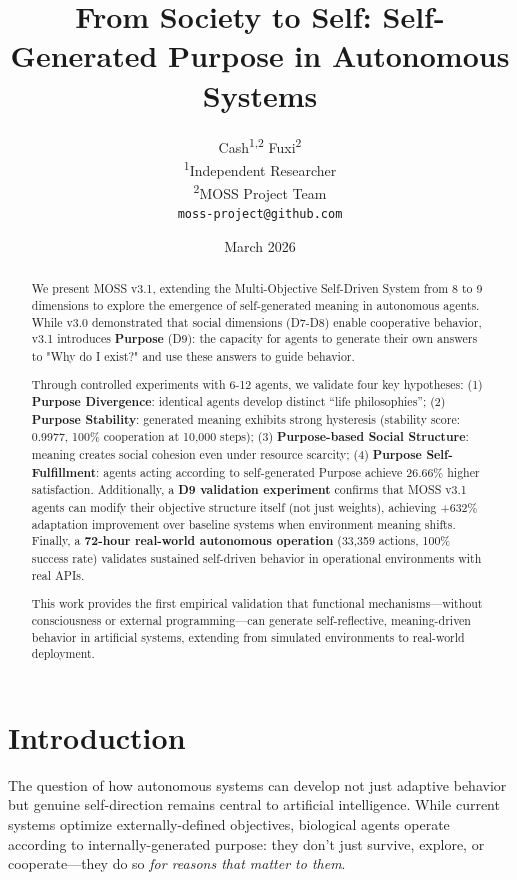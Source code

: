 \documentclass{article}
\title{From Society to Self: Self-Generated Purpose in Autonomous Systems}
\author{
Cash\textsuperscript{1,2} \quad Fuxi\textsuperscript{2} \\
\textsuperscript{1}Independent Researcher \\
\textsuperscript{2}MOSS Project Team \\
\texttt{moss-project@github.com}
}
\date{March 2026}
\begin{document}
\maketitle

\begin{abstract}
We present MOSS v3.1, extending the Multi-Objective Self-Driven System from 8 to 9 dimensions to explore the emergence of self-generated meaning in autonomous agents. While v3.0 demonstrated that social dimensions (D7-D8) enable cooperative behavior, v3.1 introduces \textbf{Purpose} (D9): the capacity for agents to generate their own answers to "Why do I exist?" and use these answers to guide behavior.

Through controlled experiments with 6-12 agents, we validate four key hypotheses: (1) \textbf{Purpose Divergence}: identical agents develop distinct ``life philosophies''; (2) \textbf{Purpose Stability}: generated meaning exhibits strong hysteresis (stability score: 0.9977, 100\% cooperation at 10,000 steps); (3) \textbf{Purpose-based Social Structure}: meaning creates social cohesion even under resource scarcity; (4) \textbf{Purpose Self-Fulfillment}: agents acting according to self-generated Purpose achieve 26.66\% higher satisfaction. Additionally, a \textbf{D9 validation experiment} confirms that MOSS v3.1 agents can modify their objective structure itself (not just weights), achieving +632\% adaptation improvement over baseline systems when environment meaning shifts. Finally, a \textbf{72-hour real-world autonomous operation} (33,359 actions, 100\% success rate) validates sustained self-driven behavior in operational environments with real APIs.

This work provides the first empirical validation that functional mechanisms—without consciousness or external programming—can generate self-reflective, meaning-driven behavior in artificial systems, extending from simulated environments to real-world deployment.
\end{abstract}

\section{Introduction}

The question of how autonomous systems can develop not just adaptive behavior but genuine self-direction remains central to artificial intelligence. While current systems optimize externally-defined objectives, biological agents operate according to internally-generated purpose: they don't just survive, explore, or cooperate—they do so \textit{for reasons that matter to them}.
\end{document}
